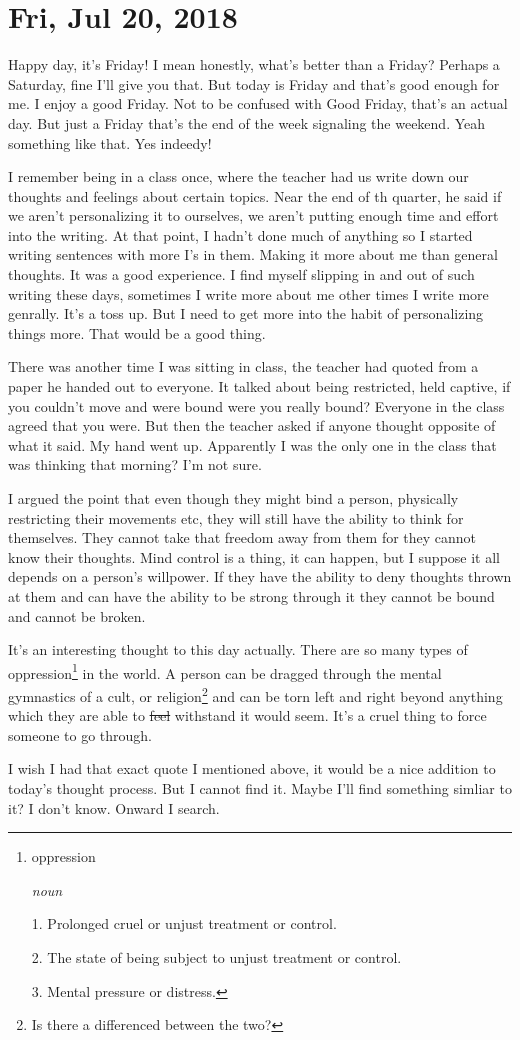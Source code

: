 \section{Fri, Jul 20, 2018}

Happy day, it's Friday! I mean honestly, what's better than a Friday? Perhaps a
Saturday, fine I'll give you that. But today is Friday and that's good enough
for me. I enjoy a good Friday. Not to be confused with Good Friday, that's an
actual day. But just a Friday that's the end of the week signaling the weekend.
Yeah something like that. Yes indeedy!

I remember being in a class once, where the teacher had us write down our
thoughts and feelings about certain topics. Near the end of th quarter, he said
if we aren't personalizing it to ourselves, we aren't putting enough time and
effort into the writing. At that point, I hadn't done much of anything so I
started writing sentences with more I's in them. Making it more about me than
general thoughts. It was a good experience. I find myself slipping in and out of
such writing these days, sometimes I write more about me other times I write
more genrally. It's a toss up. But I need to get more into the habit of
personalizing things more. That would be a good thing.

There was another time I was sitting in class, the teacher had quoted from a
paper he handed out to everyone. It talked about being restricted, held captive,
if you couldn't move and were bound were you really bound? Everyone in the class
agreed that you were. But then the teacher asked if anyone thought opposite of
what it said. My hand went up. Apparently I was the only one in the class that
was thinking that morning? I'm not sure.

I argued the point that even though they might bind a person, physically
restricting their movements etc, they will still have the ability to think for
themselves. They cannot take that freedom away from them for they cannot know
their thoughts. Mind control is a thing, it can happen, but I suppose it all
depends on a person's willpower. If they have the ability to deny thoughts
thrown at them and can have the ability to be strong through it they cannot be
bound and cannot be broken.

It's an interesting thought to this day actually. There are so many types of
oppression\footnote{
oppression

\textit{noun}

1. Prolonged cruel or unjust treatment or control.

2. The state of being subject to unjust treatment or control.

3. Mental pressure or distress.
} in the world. A person can be dragged through the mental gymnastics of a cult,
or religion\footnote{Is there a differenced between the two?} and can be torn
left and right beyond anything which they are able to \st{feel} withstand it 
would seem. It's a cruel thing to force someone to go through.

I wish I had that exact quote I mentioned above, it would be a nice addition to
today's thought process. But I cannot find it. Maybe I'll find something simliar
to it? I don't know. Onward I search.